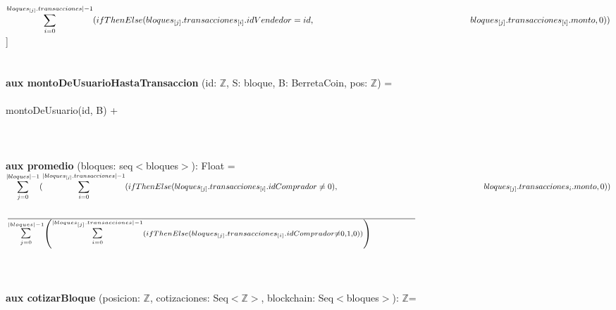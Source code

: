 \documentclass{article}
\newcommand{\Entero}{$\mathds{Z}$}
\begin{document}
        \indent\indent\indent\indent\indent
        $\mathlarger\sum\limits_{i=0}^{bloques_{[j]}.transacciones|-1} (ifThenElse (bloques_{[j]}.transacciones_{[i]}.idVendedor = id,\\
        \indent\indent\indent\indent\indent\indent\indent\indent\indent\indent\indent\indent bloques_{[j]}.transacciones_{[i]}.monto, 0))$ ]\\\\\\

    \textbf{aux montoDeUsuarioHastaTransaccion} (id: \Entero, S: bloque, B: BerretaCoin, pos: \Entero) =\\\\
        \indent\indent montoDeUsuario(id, B) +\\\\
        \indent\indent [ $\mathlarger\sum\limits_{i=0}^{pos} (ifThenElse (S.transacciones_{[i]}.idComprador = id, bloques_{[j]}.transacciones_{[i]}.monto, 0))$\\\\\\
        \indent\indent+\\

        \indent\indent $\mathlarger\sum\limits_{i=0}^{pos} (ifThenElse (S.transacciones_{[i]}.idVendedor = id, bloques_{[j]}.transacciones_{[i]}.monto, 0))$ ]\\\\

    \textbf{aux promedio} (bloques: seq$<$bloques$>$): Float = \\

        \indent\indent $\mathlarger\sum\limits_{j=0}^{|bloques|-1} (\mathlarger\sum\limits_{i=0}^{|bloques_{[j]}.transacciones|-1}
        (ifThenElse (bloques_{[j]}.transacciones_{[i]}.idComprador \ne 0),\\
        \indent\indent\indent\indent\indent\indent\indent\indent\indent\indent\indent\indent bloques_{[j]}.transacciones_{{i}}.monto, 0))$

        \indent\indent$\frac{}{\mathlarger\sum\limits_{j=0}^{|bloques|-1} \left(\mathlarger\sum\limits_{i=0}^{|bloques_{[j]}.transacciones|-1} (ifThenElse(bloques_{[j]}.transacciones_{[i]}.idComprador \ne 0, 1, 0))\right)\indent\indent\indent}$\\\\\\\\

    \textbf{aux cotizarBloque} (posicion: \Entero, cotizaciones: Seq$<$\Entero$>$, blockchain: Seq$<$bloques$>$): \Entero =\\
\end{document}
